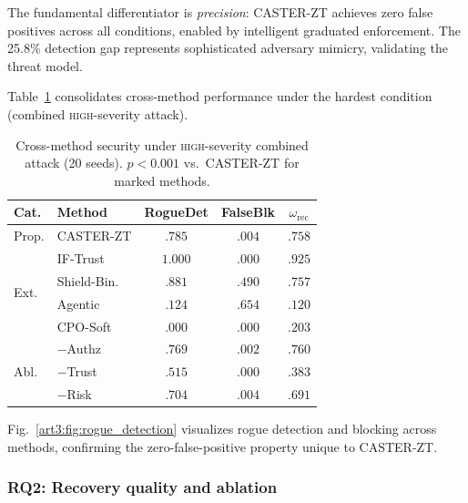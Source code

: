 The fundamental differentiator is \emph{precision}: CASTER-ZT achieves zero false positives across all conditions, enabled by intelligent graduated enforcement.
The 25.8\% detection gap represents sophisticated adversary mimicry, validating the threat model.

Table~\ref{art3:tab:cross_method} consolidates cross-method performance under the hardest condition (combined \textsc{high}-severity attack).

\begin{table}[t]
\centering
\caption{Cross-method security under \textsc{high}-severity combined attack (20 seeds). $p<0.001$ vs.\ CASTER-ZT for marked methods.}
\label{art3:tab:cross_method}
\scriptsize
\setlength{\tabcolsep}{2pt}
\begin{tabular}{@{}llccc@{}}
\toprule
Cat. & Method & RogueDet & FalseBlk & $\omega_{\mathrm{rec}}$ \\
\midrule
Prop. & CASTER-ZT & $\mathbf{.785}$ & $\mathbf{.004}$ & $\mathbf{.758}$ \\
\midrule
\multirow{4}{*}{Ext.}
  & IF-Trust & $1.000$ & $.000$ & $.925$ \\
  & Shield-Bin. & $.881$ & $.490$ & $.757$ \\
  & Agentic & $.124$ & $.654$ & $.120$ \\
  & CPO-Soft & $.000$ & $.000$ & $.203$ \\
\midrule
\multirow{3}{*}{Abl.}
  & $-$Authz & $.769$ & $.002$ & $.760$ \\
  & $-$Trust & $.515$ & $.000$ & $.383$ \\
  & $-$Risk & $.704$ & $.004$ & $.691$ \\
\bottomrule
\end{tabular}
\end{table}

Fig.~\ref{art3:fig:rogue_detection} visualizes rogue detection and blocking across methods, confirming the zero-false-positive property unique to CASTER-ZT.

\subsubsection{RQ2: Recovery quality and ablation}

